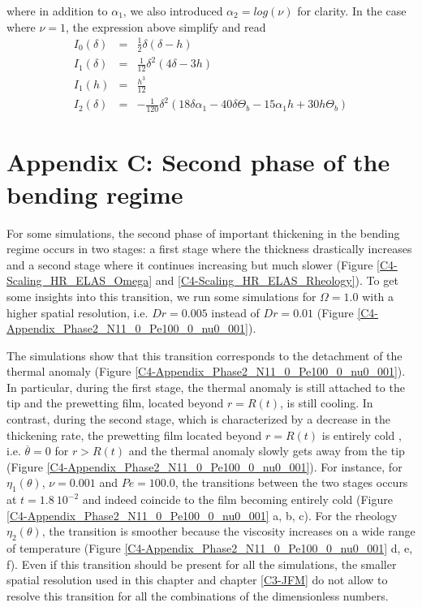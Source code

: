 where    in   addition    to    $\alpha_1$,    we   also    introduced
$\alpha_2=log(\nu)$  for  clarity.  In  the  case  where $\nu=1$,  the
expression above simplify and read
\begin{eqnarray}
I_0(\delta)&=&\frac{1}{2} \delta  (\delta -h)\nonumber\\
I_1(\delta)&=&\frac{1}{12} \delta ^2 (4 \delta -3 h)\nonumber\\
I_1(h)&=&\frac{h^3}{12}\nonumber\\
I_2(\delta)&=&-\frac{1}{120} \delta ^2 (18 \delta  \alpha_1-40 \delta  \Theta_b-15 \alpha_1 h+30 h \Theta_b)\nonumber
\end{eqnarray}

\section*{Appendix C: Second phase of the bending regime}
\label{C4-Heat:AppendixC}

For some simulations, the second  phase of important thickening in the
bending regime occurs in two stages: a first stage where the thickness
drastically increases and a second stage where it continues increasing
but   much    slower   (Figure    \ref{C4-Scaling_HR_ELAS_Omega}   and
\ref{C4-Scaling_HR_ELAS_Rheology}).   To get  some insights  into this
transition, we  run some  simulations for  $\Omega=1.0$ with  a higher
spatial  resolution, i.e.   $Dr=0.005$  instead  of $Dr=0.01$  (Figure
\ref{C4-Appendix_Phase2_N11_0_Pe100_0_nu0_001}).

The  simulations   show  that  this  transition   corresponds  to  the
detachment       of       the      thermal       anomaly       (Figure
\ref{C4-Appendix_Phase2_N11_0_Pe100_0_nu0_001}).     In    particular,
during the first  stage, the thermal anomaly is still  attached to the
tip  and  the  prewetting  film, located  beyond  $r=R(t)$,  is  still
cooling.  In contrast, during the second stage, which is characterized
by  a decrease  in the  thickening rate,  the prewetting  film located
beyond $r=R(t)$  is entirely cold  , i.e.  $\overline{\theta}  =0$ for
$r>R(t)$ and the thermal anomaly slowly gets away from the tip (Figure
\ref{C4-Appendix_Phase2_N11_0_Pe100_0_nu0_001}).   For  instance,  for
$\eta_1(\theta)$, $\nu=0.001$ and  $Pe=100.0$, the transitions between
the two  stages occurs at  $t=1.8~10^{-2}$ and indeed coincide  to the
film          becoming          entirely         cold          (Figure
\ref{C4-Appendix_Phase2_N11_0_Pe100_0_nu0_001}  a,  b,  c).   For  the
rheology  $\eta_2(\theta)$, the  transition  is  smoother because  the
viscosity   increases  on   a  wide   range  of   temperature  (Figure
\ref{C4-Appendix_Phase2_N11_0_Pe100_0_nu0_001} d, e,  f). Even if this
transition  should be  present for  all the  simulations, the  smaller
spatial resolution  used in this  chapter and chapter  \ref{C3-JFM} do
not allow to  resolve this transition for all the  combinations of the
dimensionless numbers.


